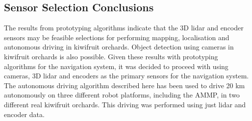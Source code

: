 \documentclass[preprint,authoryear,12pt]{elsarticle}
\begin{document}




\subsection{Sensor Selection Conclusions}
    The results from prototyping algorithms indicate that the 3D lidar and encoder sensors may be feasible selections for performing mapping, localisation and autonomous driving in kiwifruit orchards.
	Object detection using cameras in kiwifruit orchards is also possible.
	Given these results with prototyping algorithms for the navigation system, it was decided to proceed with using cameras, 3D lidar and encoders as the primary sensors for the navigation system.
    The autonomous driving algorithm described here has been used to drive 20 km autonomously on three different robot platforms, including the AMMP, in two different real kiwifruit orchards. This driving was performed using just lidar and encoder data.
\end{document}
